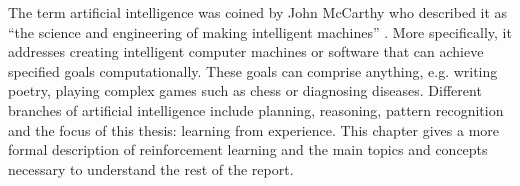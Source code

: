 The term artificial intelligence was coined by John McCarthy who described it as ``the science and engineering of making intelligent machines'' \parencite{McCarthy2007:Online}. More specifically, it addresses creating intelligent computer machines or software that can achieve specified goals computationally. These goals can comprise anything, e.g. writing poetry, playing complex games such as chess or diagnosing diseases. Different branches of artificial intelligence include planning, reasoning, pattern recognition and the focus of this thesis: learning from experience.
This chapter gives a more formal description of reinforcement learning and the main topics and concepts necessary to understand the rest of the report. 
